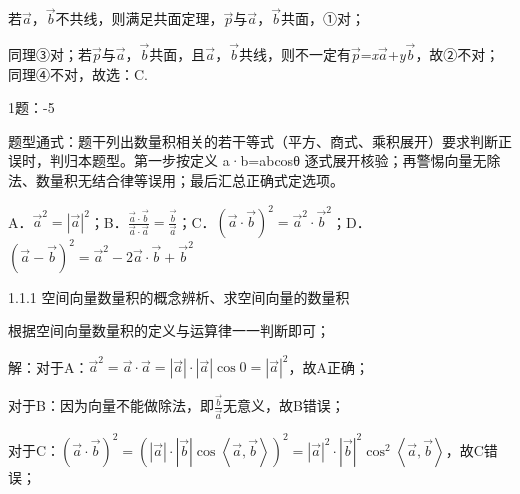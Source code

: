 若\(\overrightarrow{a}\)，\(\overrightarrow{b}\)不共线，则满足共面定理，\(\overrightarrow{p}\)与\(\overrightarrow{a}\)，\(\overrightarrow{b}\)共面，①对；

同理③对；若\(\overrightarrow{p}\)与\(\overrightarrow{a}\)，\(\overrightarrow{b}\)共面，且\(\overrightarrow{a}\)，\(\overrightarrow{b}\)共线，则不一定有\(\overrightarrow{p}\)=\emph{x}\(\overrightarrow{a}\)+\emph{y}\(\overrightarrow{b}\)，故②不对；同理④不对，故选：C.


1题：-5

题型通式：题干列出数量积相关的若干等式（平方、商式、乘积展开）要求判断正误时，判归本题型。第一步按定义
a·b=\textbar a\textbar\textbar b\textbar cosθ
逐式展开核验；再警惕向量无除法、数量积无结合律等误用；最后汇总正确式定选项。


 \noindent A．\({\overrightarrow{a}}^{2} = \allowbreak\left| \overrightarrow{a} \right|^{2}\)；B．\(\frac{\overrightarrow{a} \cdot \overrightarrow{b}}{\overrightarrow{a} \cdot \overrightarrow{a}} = \frac{\overrightarrow{b}}{\overrightarrow{a}}\)；C．\(\left( \overrightarrow{a} \cdot \overrightarrow{b} \right)^{2} = {\overrightarrow{a}}^{2} \cdot {\overrightarrow{b}}^{2}\)；D．\(\left( \overrightarrow{a} - \overrightarrow{b} \right)^{2} = {\overrightarrow{a}}^{2} - 2\overrightarrow{a} \cdot \overrightarrow{b} + {\overrightarrow{b}}^{2}\)

\noindent\hangindent=7mm\quad{}1.1.1 空间向量数量积的概念辨析、求空间向量的数量积

根据空间向量数量积的定义与运算律一一判断即可；

解：对于A：\({\overrightarrow{a}}^{2} = \overrightarrow{a} \cdot \overrightarrow{a} = \allowbreak\left| \overrightarrow{a} \right| \cdot \allowbreak\left| \overrightarrow{a} \right|\cos 0 = \allowbreak\left| \overrightarrow{a} \right|^{2}\)，故A正确；

对于B：因为向量不能做除法，即\(\frac{\overrightarrow{b}}{\overrightarrow{a}}\)无意义，故B错误；

对于C：\(\left( \overrightarrow{a} \cdot \overrightarrow{b} \right)^{2} = \allowbreak\left( \left| \overrightarrow{a} \right| \cdot \allowbreak\left| \overrightarrow{b} \right|\cos\left\langle \overrightarrow{a},\overrightarrow{b} \right\rangle \right)^{2} = \allowbreak\left| \overrightarrow{a} \right|^{2} \cdot \allowbreak\left| \overrightarrow{b} \right|^{2}\cos^{2}\left\langle \overrightarrow{a},\overrightarrow{b} \right\rangle\)，故C错误；

